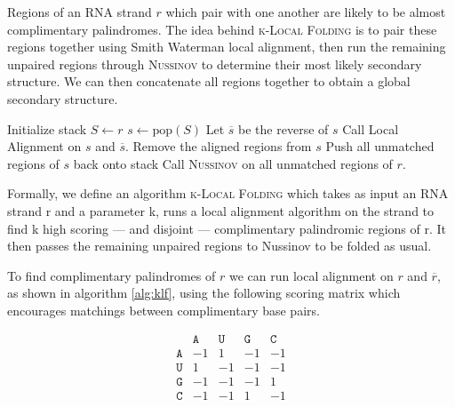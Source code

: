 \documentclass[11pt]{article}
\newcommand{\A}{\texttt{A}}
\newcommand{\G}{\texttt{G}}
\newcommand{\U}{\texttt{U}}
\newcommand{\C}{\texttt{C}}
\newcommand{\klf}{\textsc{k-Local Folding}\xspace}
\newcommand{\rf}{\textsc{Nussinov}\xspace}
\begin{document}
Regions of an RNA strand $r$ which pair with one another are likely to be almost complimentary palindromes. The idea behind \klf is to pair these regions together using Smith Waterman local alignment, then run the remaining unpaired regions through \rf to determine their most likely secondary structure. We can then concatenate all regions together to obtain a global secondary structure. \\

\begin{algorithm}[h]
\caption{\klf}
\label{alg:klf}
\begin{algorithmic}[1]
\State Initialize stack $S\gets r$
\State $s\gets \text{pop}(S)$
\State Let $\overline{s}$ be the reverse of $s$
\State Call Local Alignment on $s$ and $\overline{s}$.
\State Remove the aligned regions from $s$
\State Push all unmatched regions of $s$ back onto stack
\EndIf 
\EndWhile
\State Call \rf on all unmatched regions of $r$. 
\EndProcedure
\end{algorithmic}
\end{algorithm}


Formally, we define an algorithm \klf which takes as input an RNA strand r and a parameter k, runs a local alignment algorithm on the strand to find k high scoring — and disjoint — complimentary palindromic regions of r. It then passes the remaining unpaired regions to Nussinov to be folded as usual.


To find complimentary palindromes of $r$ we can run local alignment on $r$ and $\overline{r}$, as shown in algorithm \ref*{alg:klf}, using the following scoring matrix which encourages matchings between complimentary base pairs. 

\[\begin{array}{ccccc}
& \A & \U & \G & \C\\
\A & -1 & 1 & -1 & -1 \\
\U & 1 & -1 & -1 & -1 \\
\G & -1 & -1 & -1 & 1\\
\C & -1 & -1 & 1 & -1 
\end{array}\]
\end{document}
